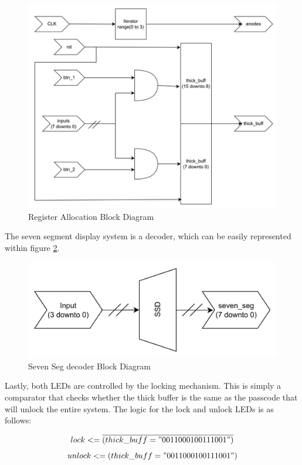 \documentclass[12pt,a4paper]{article}
\begin{document}
\begin{figure}[H]
    \centering
    \includegraphics[scale=0.5]{images/reg_all.png}
    \caption{Register Allocation Block Diagram}
    \label{fig:reg_all}
\end{figure}

The seven segment display system is a decoder, which can be easily represented within figure \ref{fig:ssd}.

\begin{figure}[H]
    \centering
    \includegraphics[scale=0.25]{images/ssd.png}
    \caption{Seven Seg decoder Block Diagram}
    \label{fig:ssd}
\end{figure}

Lastly, both LEDs are controlled by the locking mechanism. This is simply a comparator that checks whether the thick buffer is the same as the passcode that will unlock the entire system. The logic for the lock and unlock LEDs is as follows:

\[lock <= \overline{(thick\_buff = "0011000100111001")}\]
\[unlock <= (thick\_buff = "0011000100111001")\]
\end{document}
